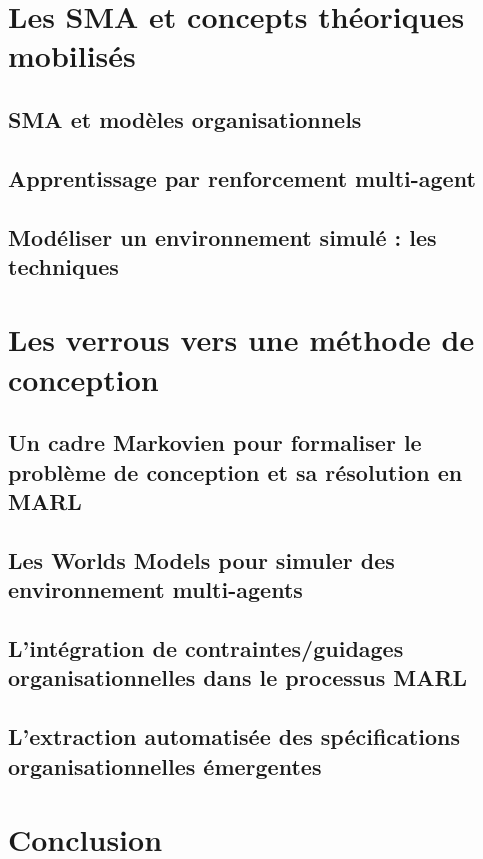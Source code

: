 \documentclass[ twoside,openright,titlepage,numbers=noenddot,headinclude,%
                footinclude=true,cleardoublepage=empty,abstractoff, %
                BCOR=5mm,paper=a4,fontsize=11pt,%
                french,american,%
                ]{scrreprt}
\begin{document}
\chapter{Les SMA et concepts théoriques mobilisés}

\section{SMA et modèles organisationnels}

\section{Apprentissage par renforcement multi-agent}

\section{Modéliser un environnement simulé : les techniques }

\chapter{Les verrous vers une méthode de conception}

\section{Un cadre Markovien pour formaliser le problème de conception et sa résolution en MARL}
\section{Les Worlds Models pour simuler des environnement multi-agents}
\section{L'intégration de contraintes/guidages organisationnelles dans le processus MARL}
\section{L'extraction automatisée des spécifications organisationnelles émergentes}

\chapter*{Conclusion}
\end{document}
